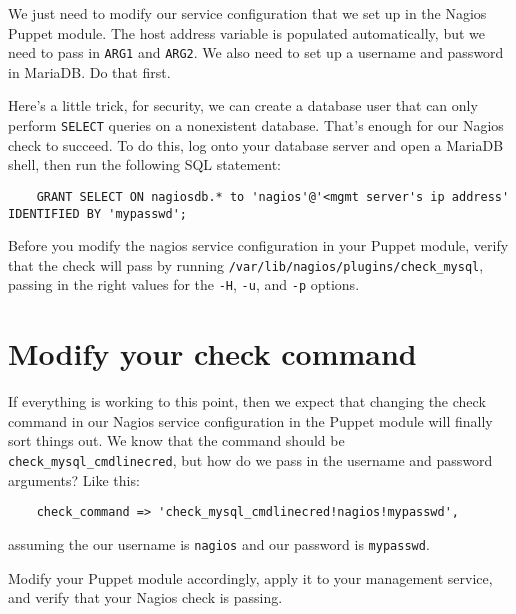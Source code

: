 \documentclass{article}         %
\begin{document}
We just need to modify our service configuration that we set up in the Nagios Puppet module. The host address variable is populated automatically, but we need to pass in \texttt{ARG1} and \texttt{ARG2}. We also need to set up a username and password in MariaDB. Do that first.

Here's a little trick, for security, we can create a database user that can only perform \texttt{SELECT} queries on a nonexistent database. That's enough for our Nagios check to succeed. To do this, log onto your database server and open a MariaDB shell, then run the following SQL statement:

\begin{verbatim}
    GRANT SELECT ON nagiosdb.* to 'nagios'@'<mgmt server's ip address' IDENTIFIED BY 'mypasswd';
\end{verbatim}

Before you modify the nagios service configuration in your Puppet module, verify that the check will pass by running \texttt{/var/lib/nagios/plugins/check\_mysql}, passing in the right values for the \texttt{-H}, \texttt{-u}, and \texttt{-p} options.

\section{Modify your check command}
If everything is working to this point, then we expect that changing the check command in our Nagios service configuration in the Puppet module will finally sort things out. We know that the command should be \texttt{check\_mysql\_cmdlinecred}, but how do we pass in the username and password arguments? Like this:

\begin{verbatim}
    check_command => 'check_mysql_cmdlinecred!nagios!mypasswd',
\end{verbatim}

assuming the our username is \texttt{nagios} and our password is \texttt{mypasswd}. 

Modify your Puppet module accordingly, apply it to your management service, and verify that your Nagios check is passing.
\end{document}
